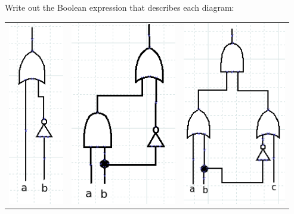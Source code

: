 \documentclass[a4paper,12pt]{book}
\newcounter{question}
\begin{document}
        \begin{questionNOGRADE}{\thequestion}

			Write out the Boolean expression that describes each diagram:


            \begin{center}
                \begin{tabular}{c c c}
                    \includegraphics[height=8cm]{images/3-5-gate4.png} &
                    \includegraphics[height=8cm]{images/3-5-gate5.png} &
                    \includegraphics[height=8cm]{images/3-5-gate6.png}


\end{tabular}
\end{center}
\end{questionNOGRADE}
\end{document}
